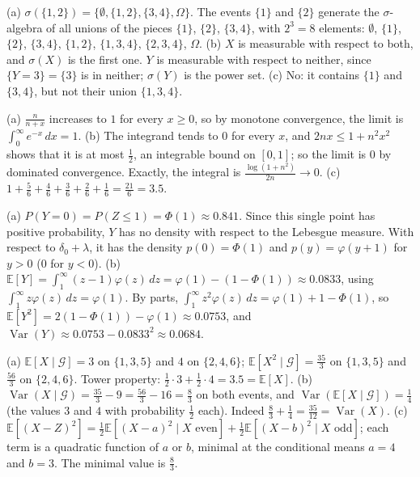 \documentclass[11pt]{article}
\newcommand{\E}{\mathbb{E}}
\DeclareMathOperator{\Var}{Var}
\begin{document}
\begin{description}[leftmargin=0pt, itemsep=0.3em]
    \item[\ref{pr:sigma-algebra}.] (a) $\sigma(\{1, 2\}) = \{\emptyset, \{1, 2\}, \{3, 4\}, \Omega\}$. The events $\{1\}$ and $\{2\}$ generate the $\sigma$-algebra of all unions of the pieces $\{1\}$, $\{2\}$, $\{3, 4\}$, with $2^3 = 8$ elements: $\emptyset$, $\{1\}$, $\{2\}$, $\{3, 4\}$, $\{1, 2\}$, $\{1, 3, 4\}$, $\{2, 3, 4\}$, $\Omega$. (b) $X$ is measurable with respect to both, and $\sigma(X)$ is the first one. $Y$ is measurable with respect to neither, since $\{Y = 3\} = \{3\}$ is in neither; $\sigma(Y)$ is the power set. (c) No: it contains $\{1\}$ and $\{3, 4\}$, but not their union $\{1, 3, 4\}$.
    \item[\ref{pr:lebesgue-limits}.] (a) $\frac{n}{n + x}$ increases to $1$ for every $x \geq 0$, so by monotone convergence, the limit is $\int_0^\infty e^{-x}\, dx = 1$. (b) The integrand tends to $0$ for every $x$, and $2nx \leq 1 + n^2x^2$ shows that it is at most $\frac{1}{2}$, an integrable bound on $[0, 1]$; so the limit is $0$ by dominated convergence. Exactly, the integral is $\frac{\log(1 + n^2)}{2n} \to 0$. (c) $1 + \frac{5}{6} + \frac{4}{6} + \frac{3}{6} + \frac{2}{6} + \frac{1}{6} = \frac{21}{6} = 3.5$.
    \item[\ref{pr:relu-shift}.] (a) $P(Y = 0) = P(Z \leq 1) = \Phi(1) \approx 0.841$. Since this single point has positive probability, $Y$ has no density with respect to the Lebesgue measure. With respect to $\delta_0 + \lambda$, it has the density $p(0) = \Phi(1)$ and $p(y) = \varphi(y + 1)$ for $y > 0$ ($0$ for $y < 0$). (b) $\E[Y] = \int_1^\infty (z - 1)\varphi(z)\, dz = \varphi(1) - (1 - \Phi(1)) \approx 0.0833$, using $\int_1^\infty z\varphi(z)\, dz = \varphi(1)$. By parts, $\int_1^\infty z^2\varphi(z)\, dz = \varphi(1) + 1 - \Phi(1)$, so $\E[Y^2] = 2(1 - \Phi(1)) - \varphi(1) \approx 0.0753$, and $\Var(Y) \approx 0.0753 - 0.0833^2 \approx 0.0684$.
    \item[\ref{pr:conditional-sigma}.] (a) $\E[X \mid \mathcal{G}] = 3$ on $\{1, 3, 5\}$ and $4$ on $\{2, 4, 6\}$; $\E[X^2 \mid \mathcal{G}] = \frac{35}{3}$ on $\{1, 3, 5\}$ and $\frac{56}{3}$ on $\{2, 4, 6\}$. Tower property: $\frac{1}{2} \cdot 3 + \frac{1}{2} \cdot 4 = 3.5 = \E[X]$. (b) $\Var(X \mid \mathcal{G}) = \frac{35}{3} - 9 = \frac{56}{3} - 16 = \frac{8}{3}$ on both events, and $\Var(\E[X \mid \mathcal{G}]) = \frac{1}{4}$ (the values $3$ and $4$ with probability $\frac{1}{2}$ each). Indeed $\frac{8}{3} + \frac{1}{4} = \frac{35}{12} = \Var(X)$. (c) $\E[(X - Z)^2] = \frac{1}{2}\E[(X - a)^2 \mid X \text{ even}] + \frac{1}{2}\E[(X - b)^2 \mid X \text{ odd}]$; each term is a quadratic function of $a$ or $b$, minimal at the conditional means $a = 4$ and $b = 3$. The minimal value is $\frac{8}{3}$.

\end{description}
\end{document}
